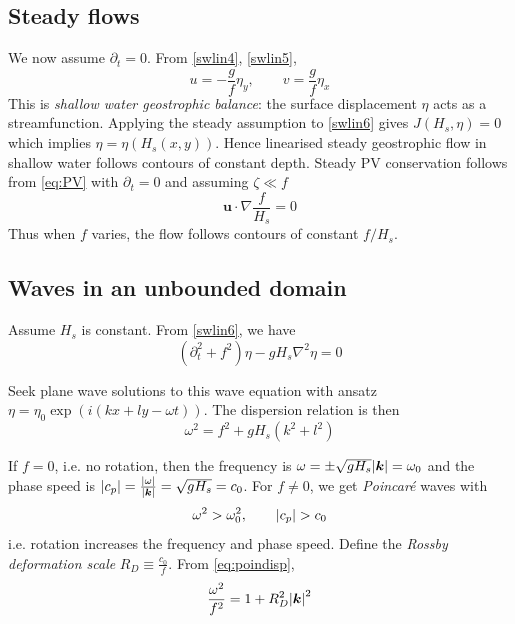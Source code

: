 \documentclass{jknotes}
\begin{document}
\subsection{Steady flows}
We now assume $\partial_t = 0$. From \eqref{swlin4}, \eqref{swlin5},
\begin{equation}
	u = -\frac{g}{f}\eta_y, \hspace{2em} v = \frac{g}{f}\eta_x
\end{equation}
This is \emph{shallow water geostrophic balance}: the surface displacement
$\eta$ acts as a streamfunction. Applying the steady assumption to
\eqref{swlin6} gives $J(H_s, \eta) = 0$ which implies $\eta = \eta(H_s(x,y))$.
Hence linearised steady geostrophic flow in shallow water follows contours of
constant depth.  Steady PV conservation follows from \eqref{eq:PV} with
$\partial_t = 0$ and assuming $\zeta \ll f$
\begin{equation}
	\bm{u} \cdot \nabla \frac{f}{H_s} = 0
\end{equation}
Thus when $f$ varies, the flow follows contours of constant $f/H_s$.

\subsection{Waves in an unbounded domain}
Assume $H_s$ is constant. From \eqref{swlin6}, we have
\begin{equation}
	\left( \partial_t^2 + f^2\right)\eta - gH_s \nabla^2 \eta = 0
\end{equation}

Seek plane wave solutions to this wave equation with ansatz $\eta = \eta_0
\exp(i(kx+ly-\omega t))$. The dispersion relation is then
\begin{equation}
	\omega^2 = f^2 + gH_s (k^2 + l^2) \label{eq:poindisp}
\end{equation}

If $f = 0$, i.e. no rotation, then the frequency is $\omega = \pm \sqrt{gH_s}
\abs{\bm{k}} = \omega_0$ and the phase speed is $\abs{c_p} =
\frac{\abs{\omega}}{\abs{\bm{k}}} = \sqrt{gH_s} = c_0$. For $f \ne 0$, we get
\emph{Poincar\'{e}} waves with
\begin{equation}
	\omega^2 > \omega_0^2, \hspace{2em} \abs{c_p} > c_0
\end{equation}
i.e. rotation increases the frequency and phase speed. Define the \emph{Rossby
deformation scale} $R_D \equiv \frac{c_0}{f}$. From \eqref{eq:poindisp},
\begin{equation}
	\frac{\omega^2}{f^2} = 1 + R^2_D \abs{\bm{k}}^2
\end{equation}
\end{document}
